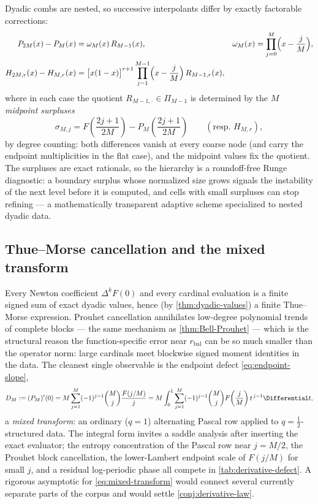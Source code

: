 Dyadic combs are nested, so successive interpolants differ by exactly
factorable corrections:
\begin{align}
 P_{2M}(x)-P_{M}(x)
 &=\omega_M(x)\,R_{M-1}(x),
 &\omega_M(x)&=\prod_{j=0}^{M}\Bigl(x-\frac jM\Bigr),
 \label{eq:nested-ordinary}\\
 H_{2M,r}(x)-H_{M,r}(x)
 &=\bigl[x(1-x)\bigr]^{r+1}
 \prod_{j=1}^{M-1}\Bigl(x-\frac jM\Bigr)\,R_{M-1,r}(x),
 \label{eq:nested-flat}
\end{align}
where in each case the quotient $R_{M-1,\cdot}\in\Pi_{M-1}$ is
determined by the $M$ \emph{midpoint surpluses}
\begin{equation}
 \sigma_{M,j}
 =F\!\left(\frac{2j+1}{2M}\right)
 -P_{M}\!\left(\frac{2j+1}{2M}\right)
 \qquad(\text{resp.\ }H_{M,r}),
 \label{eq:midpoint-surplus}
\end{equation}
by degree counting: both differences vanish at every coarse node (and
carry the endpoint multiplicities in the flat case), and the midpoint
values fix the quotient.  The surpluses are exact rationals, so the
hierarchy is a roundoff-free Runge diagnostic: a boundary surplus
whose normalized size grows signals the instability of the next level
before it is computed, and cells with small surpluses can stop
refining --- a mathematically transparent adaptive scheme specialized
to nested dyadic data.

\subsection{Thue--Morse cancellation and the mixed transform}

Every Newton coefficient $\Delta^{k}F(0)$ and every cardinal
evaluation is a finite signed sum of exact dyadic values, hence (by
\cref{thm:dyadic-values}) a finite Thue--Morse expression.  Prouhet
cancellation annihilates low-degree polynomial trends of complete
blocks --- the same mechanism as \cref{thm:Bell-Prouhet} --- which is
the structural reason the function-specific error near
$r_{\mathrm{bal}}$ can be so much smaller than the operator norm:
large cardinals meet blockwise signed moment identities in the data.
The cleanest single observable is the endpoint defect
\eqref{eq:endpoint-slope},
\begin{equation}
 D_M:=(P_M)'(0)
 =M\sum_{j=1}^{M}(-1)^{j-1}\binom Mj\frac{F(j/M)}{j}
 =M\int_0^1\sum_{j=1}^{M}(-1)^{j-1}\binom Mj
 F\!\left(\frac jM\right)t^{\,j-1}\Differential t,
 \label{eq:mixed-transform}
\end{equation}
a \emph{mixed transform}: an ordinary ($q{=}1$) alternating Pascal row
applied to $q{=}\tfrac12$-structured data.  The integral form invites
a saddle analysis after inserting the exact evaluator; the entropy
concentration of the Pascal row near $j=M/2$, the Prouhet block
cancellation, the lower-Lambert endpoint scale of $F(j/M)$ for small
$j$, and a residual log-periodic phase all compete in
\cref{tab:derivative-defect}.  A rigorous asymptotic for
\eqref{eq:mixed-transform} would connect several currently separate
parts of the corpus and would settle
\cref{conj:derivative-law}.

